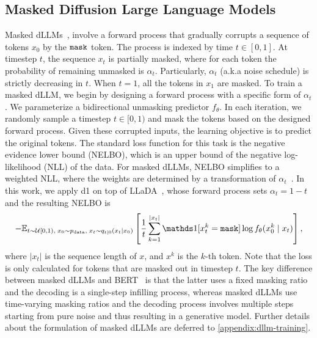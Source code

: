 \subsection{Masked Diffusion Large Language Models}
Masked dLLMs~\citep{austin2021structured, sahoo2024simple, shi2024simplified, ou2024your, loudiscrete}, involve a forward process that gradually corrupts a sequence of tokens $x_0$ by the ${\texttt{mask}}$ token. The process is indexed by time $t \in [0, 1]$. At timestep $t$, the sequence $x_t$ is partially masked, where for each token the probability of remaining unmasked is $\alpha_t$. Particularly, $\alpha_t$ (a.k.a noise schedule) is strictly decreasing in $t$. When $t=1$, all the tokens in $x_1$ are masked. 
To train a masked dLLM, we begin by designing a forward process with a specific form of $\alpha_t$. We parameterize a bidirectional unmasking predictor $f_\theta$. In each iteration, we randomly sample a timestep $t \in [0, 1)$ and mask the tokens based on the designed forward process. Given these corrupted inputs, the learning objective is to predict the original tokens. The standard loss function for this task is the negative evidence lower bound (NELBO), which is an upper bound of the negative log-likelihood (NLL) of the data. For masked dLLMs, NELBO simplifies to a weighted NLL, where the weights are determined by a transformation of $\alpha_t$~\citep[Equation (10)]{sahoo2024simple}.
In this work, we apply d1 on top of LLaDA~\citep{nie2025largelanguagediffusionmodels}, whose forward process sets $\alpha_t = 1 -t$ and the resulting NELBO is
\begin{equation}
-  \mathbb{E}_
{{t\sim \mathcal{U}[0,1)}, \; x_0 \sim p_{\text{data}}, \; x_t \sim q_{t|0}(x_t | x_0)} \left[ \frac{1}{t} \sum_{k=1}^{|x_t|} \indicator[x_t^k = \mask] \log f_{\theta}(x_0^k \mid x_t) \right],
\label{eq:llada_loss}
\end{equation}
where $|x_t|$ is the sequence length of $x$, and $x^k$ is the $k$-th token.
Note that the loss is only calculated for tokens that are masked out in timestep $t$. The key difference between masked dLLMs and BERT~\citep{devlin-etal-2019-bert} is that the latter uses a fixed masking ratio and the decoding is a single-step infilling process, whereas masked dLLMs use time-varying masking ratios and the decoding process involves multiple steps starting from pure noise and thus resulting in a generative model. Further details about the formulation of masked dLLMs are deferred to \autoref{appendix:dllm-training}.



